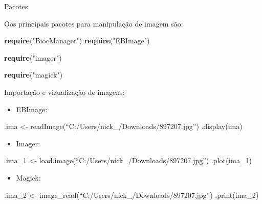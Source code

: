 \documentclass[
  ignorenonframetext,
]{beamer}
\newenvironment{Shaded}{\begin{snugshade}}{\end{snugshade}}
\newcommand{\KeywordTok}[1]{\textcolor[rgb]{0.13,0.29,0.53}{\textbf{#1}}}
\newcommand{\NormalTok}[1]{#1}
\newcommand{\StringTok}[1]{\textcolor[rgb]{0.31,0.60,0.02}{#1}}
\providecommand{\tightlist}{%
  \setlength{\itemsep}{0pt}\setlength{\parskip}{0pt}}
\begin{document}
\begin{frame}[fragile]{Pacotes}
\protect\hypertarget{pacotes}{}

\small

Oos principais pacotes para manipulação de imagem são:

\begin{Shaded}
\begin{Highlighting}[]
\KeywordTok{require}\NormalTok{(}\StringTok{"BiocManager"}\NormalTok{) }
\KeywordTok{require}\NormalTok{(}\StringTok{"EBImage"}\NormalTok{) }

\KeywordTok{require}\NormalTok{(}\StringTok{"imager"}\NormalTok{) }

\KeywordTok{require}\NormalTok{(}\StringTok{"magick"}\NormalTok{) }
\end{Highlighting}
\end{Shaded}

\end{frame}

\begin{frame}{Importação e vizualização de imagens:}
\protect\hypertarget{importauxe7uxe3o-e-vizualizauxe7uxe3o-de-imagens}{}

\small

\begin{itemize}
\tightlist
\item
  EBImage:
\end{itemize}

.ima \textless- readImage(``C:/Users/nick\_/Downloads/897207.jpg'')
.display(ima)

\begin{itemize}
\tightlist
\item
  Imager:
\end{itemize}

.ima\_1 \textless- load.image(``C:/Users/nick\_/Downloads/897207.jpg'')
.plot(ima\_1)

\begin{itemize}
\tightlist
\item
  Magick:
\end{itemize}

.ima\_2 \textless- image\_read(``C:/Users/nick\_/Downloads/897207.jpg'')
.print(ima\_2)

\end{frame}
\end{document}
